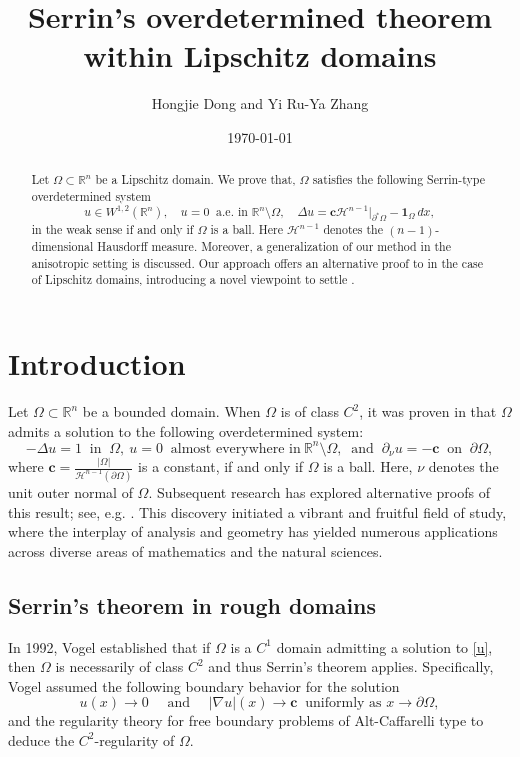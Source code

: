 \documentclass[reqno,11pt]{amsart}
\title[Serrin's overdetermined theorem within Lipschitz domains]{Serrin's overdetermined theorem within Lipschitz domains}
\author{Hongjie Dong and Yi Ru-Ya Zhang}
\date{\today}
\newcommand{\R}{\mathbb{R}}
\numberwithin{equation}{section}
\theoremstyle{remark}
\begin{document}
\begin{abstract}
Let $\Omega\subset\mathbb R^n$ be a Lipschitz domain. We prove that, 
$\Omega$ satisfies the following Serrin-type overdetermined system
   $$u \in W^{1,2}(\mathbb R^n), \quad  u=0\  \text{ a.e. in }\R^n\setminus \Omega,\quad \Delta  u=\mathbf{c}\mathscr{H}^{n-1}|_{\partial^*\Omega} - \mathbf{1}_{\Omega}\,dx,$$
 in the weak sense if and only if $\Omega$ is a ball. Here   $\mathscr H^{n-1}$ denotes the $(n-1)$-dimensional Hausdorff measure.  Moreover,   a generalization of our method in the anisotropic setting is discussed.  
Our approach   offers an alternative proof to \cite{FZ2025} in the case of Lipschitz domains, introducing a novel viewpoint to settle \cite[Question 7.1]{HLL2024}. 
\end{abstract}
 
\maketitle

\section{Introduction}
Let $\Omega\subset \mathbb R^n$ be a bounded  domain.  
When $\Omega$ is of class  $C^2$, it was proven in \cite{S1971,W1971} that  $\Omega$ admits a solution to the following overdetermined system:  
\begin{equation}\label{u}
    -\Delta u =1 \ \text{ in }\ \Omega, \ u=0 \ \text{ almost everywhere in} \  \mathbb R^n\setminus \Omega,\ \text{ and }\ \partial_\nu u=-\mathbf{c} \ \text{ on } \ \partial\Omega, 
\end{equation}
where $\mathbf{c}= \frac{|\Omega|}{\mathscr H^{n-1}(\partial \Omega)}$ is a constant,
if and only if $\Omega$ is a ball. Here,  $\nu$ denotes the unit outer normal of $\Omega$. Subsequent research has explored alternative proofs of this result; see, e.g.  \cite{BNST2008, CH1998, PS1989}. 
This discovery initiated a vibrant and fruitful field of study, where the interplay of analysis and geometry has yielded numerous applications across diverse areas of mathematics and the natural sciences.


\subsection{Serrin's theorem in rough domains}
In 1992, Vogel \cite{V1992} established that if $\Omega$ is a $C^1$ domain admitting a solution to \eqref{u}, then $\Omega$ is necessarily of class  $C^{2}$ and thus Serrin's theorem applies. Specifically, Vogel assumed the following boundary behavior for the solution 
$$u(x)\to 0 \quad \text{ and } \quad  |\nabla u|(x)\to \mathbf{c} \ \text{ uniformly as } x\to \partial \Omega,$$
and the regularity theory for free boundary problems of Alt-Caffarelli type to deduce the $C^2$-regularity of  $\Omega$. 
\end{document}
